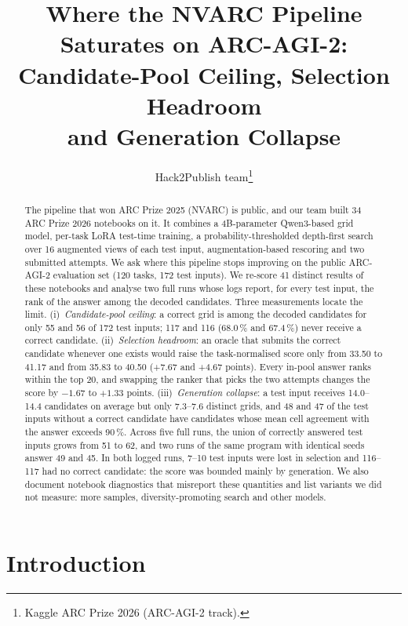 \documentclass[11pt]{article}
\title{Where the NVARC Pipeline Saturates on ARC-AGI-2:\\
Candidate-Pool Ceiling, Selection Headroom\\
and Generation Collapse}
\author{Hack2Publish team\thanks{Kaggle ARC Prize 2026 (ARC-AGI-2 track).}}
\date{}
\begin{document}
\maketitle

\begin{abstract}
The pipeline that won ARC Prize 2025 (NVARC) is public, and our team built 34 ARC Prize 2026 notebooks on it. It combines a 4B-parameter Qwen3-based grid model, per-task LoRA test-time training, a probability-thresholded depth-first search over 16 augmented views of each test input, augmentation-based rescoring and two submitted attempts.
We ask where this pipeline stops improving on the public ARC-AGI-2 evaluation set (120 tasks, 172 test inputs). We re-score 41 distinct results of these notebooks and analyse two full runs whose logs report, for every test input, the rank of the answer among the decoded candidates.
Three measurements locate the limit.
(i)~\emph{Candidate-pool ceiling}: a correct grid is among the decoded candidates for only 55 and 56 of 172 test inputs; 117 and 116 (68.0\,\% and 67.4\,\%) never receive a correct candidate.
(ii)~\emph{Selection headroom}: an oracle that submits the correct candidate whenever one exists would raise the task-normalised score only from 33.50 to 41.17 and from 35.83 to 40.50 (+7.67 and +4.67 points). Every in-pool answer ranks within the top 20, and swapping the ranker that picks the two attempts changes the score by $-1.67$ to $+1.33$ points.
(iii)~\emph{Generation collapse}: a test input receives 14.0--14.4 candidates on average but only 7.3--7.6 distinct grids, and 48 and 47 of the test inputs without a correct candidate have candidates whose mean cell agreement with the answer exceeds 90\,\%.
Across five full runs, the union of correctly answered test inputs grows from 51 to 62, and two runs of the same program with identical seeds answer 49 and 45.
In both logged runs, 7--10 test inputs were lost in selection and 116--117 had no correct candidate: the score was bounded mainly by generation.
We also document notebook diagnostics that misreport these quantities and list variants we did not measure: more samples, diversity-promoting search and other models.
\end{abstract}

\section{Introduction}
\end{document}
